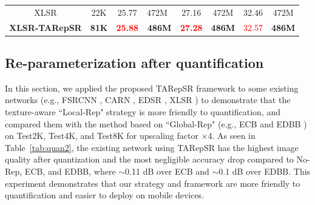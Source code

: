\documentclass[sn-mathphys]{sn-jnl}%
\theoremstyle{thmstyleone}%
\theoremstyle{thmstyletwo}%
\theoremstyle{thmstylethree}%
\begin{document}
\begin{table}[h!]
{\begin{tabular}{cc|cc|cc|cc}
\hline
XLSR                    & 22K                    & 25.77                  & 472M~                   & 27.16                  & 472M                                    & 32.46                  & 472M                                                         \\
\textbf{XLSR-TARepSR}   & \textbf{81K}                    & \textcolor{red}{\textbf{25.88}} & \textbf{486M}   & \textcolor{red}{\textbf{27.28}} & \textbf{486M}                   & \textcolor{red}{32.57} & \textbf{486M}                      \\
\hline
\end{tabular}
}
\end{table}

\subsection{Re-parameterization after quantification}
In this section, we applied the proposed TARepSR framework to some existing networks (e.g., FSRCNN \cite{FSRCNN}, CARN \cite{CARN}, EDSR \cite{EDSR}, XLSR \cite{XLSR}) to demonstrate that the texture-aware ``Local-Rep" strategy is more friendly to quantification, and compared them with the method based on ``Global-Rep" (e.g., ECB \cite{ECB} and EDBB \cite{EDBB}) on Test2K, Test4K, and Test8K for upscaling factor $\times$4. As seen in Table~\ref{tab:quan2}, the existing network using TARepSR has the highest image quality after quantization and the most negligible accuracy drop compared to No-Rep, ECB, and EDBB, where $\sim$0.11 dB over ECB and $\sim$0.1 dB over EDBB. This experiment demonstrates that our strategy and framework are more friendly to quantification and easier to deploy on mobile devices.
\end{document}
